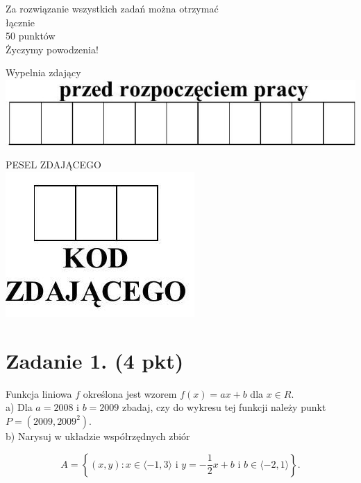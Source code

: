 \documentclass[10pt]{article}
\begin{document}
Za rozwiązanie wszystkich zadań można otrzymać\\
łącznie\\
50 punktów\\
Życzymy powodzenia!

Wypelnia zdający\\
\includegraphics[max width=\textwidth, center]{2024_11_21_8bf32a7596bd08ca7a9fg-01(1)}

PESEL ZDAJĄCEGO\\
\includegraphics[max width=\textwidth, center]{2024_11_21_8bf32a7596bd08ca7a9fg-01}

\section*{Zadanie 1. (4 pkt)}
Funkcja liniowa \(f\) określona jest wzorem \(f(x)=a x+b\) dla \(x \in R\).\\
a) Dla \(a=2008\) i \(b=2009\) zbadaj, czy do wykresu tej funkcji należy punkt \(P=\left(2009,2009^{2}\right)\).\\
b) Narysuj w układzie współrzędnych zbiór

\[
A=\left\{(x, y): x \in\langle-1,3\rangle \text { i } y=-\frac{1}{2} x+b \text { i } b \in\langle-2,1\rangle\right\} .
\]
\end{document}
